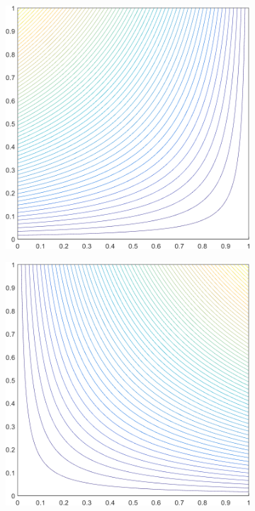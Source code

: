 \begin{figure}
\centering
	\begin{subfigure}[b]{0.39\textwidth}
		\centering
		\includegraphics[width=\textwidth]{figures/sec_BF/square_WACHSPRESS1_contour_b4.png}
		\caption{}
	\end{subfigure}
	\hspace{1.5cm}
	\begin{subfigure}[b]{0.39\textwidth}
		\centering
		\includegraphics[width=\textwidth]{figures/sec_BF/square_WACHSPRESS1_contour_b3.png}

\end{subfigure}
\end{figure}
